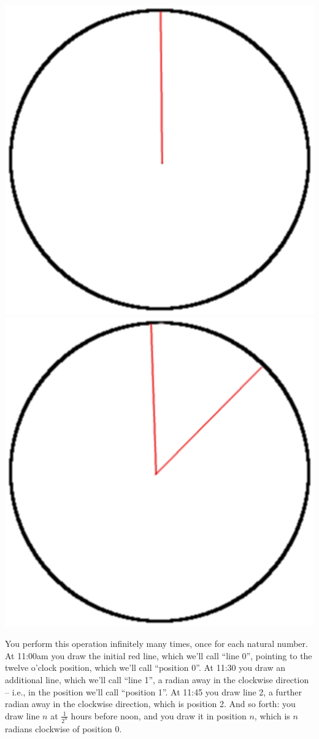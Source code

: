 \documentclass[12pt,a4paper]{article}
\begin{document}
\begin{enumerate}
	\begin{center}
\includegraphics[scale=.2]{base}  \raisebox{13mm}{$\longrightarrow$} \includegraphics[scale=.2]{2rad}
\end{center}
You perform this operation infinitely many times, once for each natural number. At 11:00am you draw the initial red line, which we'll call ``line 0'', pointing to the twelve o'clock position, which we'll call ``position 0''. At 11:30 you draw an additional line, which we'll call ``line 1'', a radian away in the clockwise direction -- i.e., in the position we'll call ``position 1''. At 11:45 you draw line 2, a further radian away in the clockwise direction, which is position 2. And so forth: you draw line $n$ at $\frac{1}{2^n}$ hours before noon, and you draw it in position $n$, which is $n$ radians clockwise of position 0.


\end{enumerate}
\end{document}
